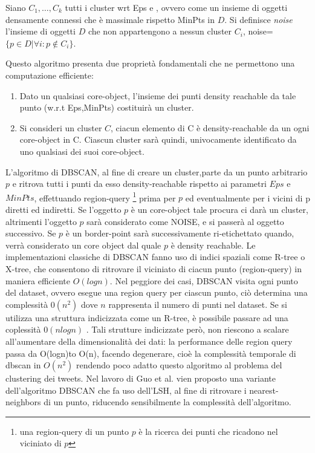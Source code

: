 \documentclass[a4paper,12pt]{report}
\begin{document}
\begin{definizione}[noise]
\label{def:noise}
Siano $C_1,\dots,C_k$ tutti i cluster wrt Eps e , ovvero come un insieme di oggetti densamente connessi che è massimale rispetto MinPts in $D$. Si definisce \emph{noise}  l'insieme di oggetti $D$ che non appartengono a nessun cluster $C_i$,
noise=$\lbrace p\in D | \forall i: p \notin C_i \rbrace $.
 
\end{definizione}
Questo algoritmo presenta due proprietà fondamentali che ne permettono una computazione efficiente:
\begin{enumerate}
\item Dato un qualsiasi core-object, l'insieme dei punti density reachable da tale punto (w.r.t Eps,MinPts) costituirà un cluster.
\item  Si consideri un cluster $C$, ciacun elemento di C è density-reachable da  un ogni core-object in C. Ciascun cluster sarà quindi, univocamente identificato da uno qualsiasi dei suoi core-object.
\end{enumerate}

L'algoritmo di DBSCAN, al fine di creare un cluster,parte da un punto arbitrario $p$ e ritrova tutti i punti da esso density-reachable rispetto ai parametri $Eps$ e $MinPts$, effettuando region-query \footnote{una region-query  di un punto $p$ è la ricerca dei punti che ricadono nel viciniato di $p$} prima per $p$ ed eventualmente per i vicini di p diretti ed indiretti.
Se l'oggetto $p$ è un core-object tale procura ci darà un cluster, altrimenti l'oggetto $p$ sarà considerato come NOISE, e si passerà al oggetto successivo. Se $p$ è un border-point sarà successivamente ri-etichettato quando, verrà considerato un core object dal quale $p$ è density reachable.
Le implementazioni classiche di DBSCAN fanno uso di indici spaziali come R-tree o X-tree, che consentono di ritrovare il viciniato di ciacun punto (region-query) in maniera efficiente $O(logn)$. Nel peggiore dei casi, DBSCAN visita ogni punto del dataset, ovvero esegue una region query per ciascun punto, ciò determina una complessità $0(n^2)$  dove $n$ rappresenta il numero di punti nel dataset. Se si utilizza una struttura indicizzata come un R-tree, è possibile passare ad una coplessità $0(nlogn)$ . 
Tali strutture indicizzate però, non riescono a scalare all'aumentare della dimensionalità dei dati: la performance delle region query passa da  O(logn)to O(n), facendo degenerare, cioè la complessità temporale di dbscan in $O(n^2)$ rendendo poco adatto questo algoritmo al problema del clustering dei tweets. Nel lavoro di Guo et al. \cite{4370588} vien proposto una variante dell'algoritmo DBSCAN che fa uso dell'LSH, al fine di ritrovare i nearest-neighbors di un punto, riducendo sensibilmente la complessità dell'algoritmo.
 
\end{document}
